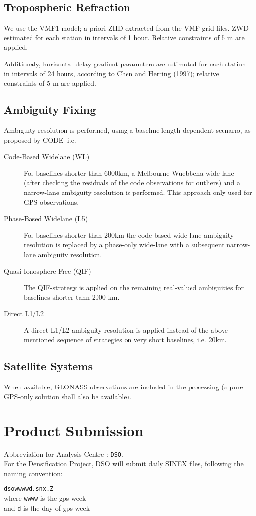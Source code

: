 \documentclass{article}
\begin{document}
\subsection{Tropospheric Refraction}
We use the VMF1 model; a priori ZHD extracted from the VMF grid files. ZWD estimated
for each station in intervals of 1 hour. Relative constraints of 5 m are applied.

Additionaly, horizontal delay gradient parameters are estimated for each station 
in intervals of 24 hours, according to Chen and Herring (1997); relative constraints of
5 m are applied.
\subsection{Ambiguity Fixing}
Ambiguity resolution is performed, using a baseline-length dependent scenario, 
as proposed by CODE, i.e.
\begin{description}
\item[Code-Based Widelane (WL)] 
For baselines shorter than 6000km, a Melbourne-Wuebbena wide-lane (after checking the residuals
of the code observations for outliers) and a narrow-lane ambiguity resolution is performed. This approach only used for GPS observations.
\item[Phase-Based Widelane (L5)] For baselines shorter than
200km the code-based wide-lane ambiguity resolution is replaced by a phase-only wide-lane
with a subsequent narrow-lane ambiguity resolution.
\item[Quasi-Ionosphere-Free (QIF)] The QIF-strategy is applied on the remaining real-valued
ambiguities for baselines shorter tahn 2000 km.
\item[Direct L1/L2] A direct L1/L2 ambiguity resolution is applied instead of
the above mentioned sequence of strategies on very short baselines, i.e. 20km.
\end{description}
\subsection{Satellite Systems}
When available, GLONASS observations are included in the processing (a pure GPS-only
solution shall also be available).
\clearpage

\section{Product Submission}
Abbreviation for Analysis Centre : \texttt{DSO}.\\

For the Densification Project, DSO will submit daily SINEX files, following the
naming convention:\\
\begin{center}
\texttt{dsowwwwd.snx.Z}\\
where \texttt{wwww} is the gps week\\
and \texttt{d} is the day of gps week\\
\end{center}

\printindex
\end{document}
